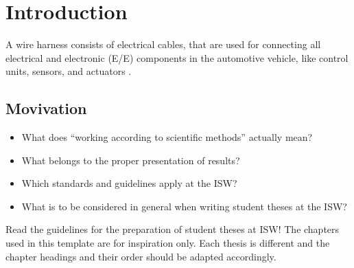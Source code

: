 \chapter{Introduction}
A wire harness consists of electrical cables, that are used for connecting all electrical and electronic (E/E) components in the automotive vehicle, like 
control units, sensors, and actuators \cite{NGUYEN2021379} \cite{TROMMNAU2019387}.  
\section{Movivation}

\begin{itemize}
\item What does ``working according to scientific methods'' actually mean?
\item What belongs to the proper presentation of results?
\item Which standards and guidelines apply at the \ac{ISW}?
\item What is to be considered in general when writing student theses at the \ac{ISW}?
\end{itemize}

Read the guidelines for the preparation of student theses at \ac{ISW}! The chapters used in this template are for inspiration only. Each thesis is different and the chapter headings and their order should be adapted accordingly.
